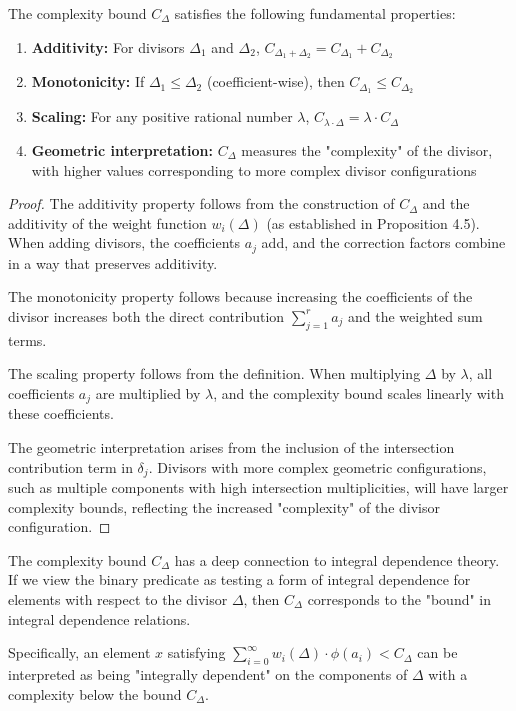 \begin{theorem}\label{thm:complexity-bound-properties}
The complexity bound $C_\Delta$ satisfies the following fundamental properties:
\begin{enumerate}
    \item \textbf{Additivity:} For divisors $\Delta_1$ and $\Delta_2$, $C_{\Delta_1 + \Delta_2} = C_{\Delta_1} + C_{\Delta_2}$
    \item \textbf{Monotonicity:} If $\Delta_1 \leq \Delta_2$ (coefficient-wise), then $C_{\Delta_1} \leq C_{\Delta_2}$
    \item \textbf{Scaling:} For any positive rational number $\lambda$, $C_{\lambda \cdot \Delta} = \lambda \cdot C_{\Delta}$
    \item \textbf{Geometric interpretation:} $C_\Delta$ measures the "complexity" of the divisor, with higher values corresponding to more complex divisor configurations
\end{enumerate}
\end{theorem}

\begin{proof}
The additivity property follows from the construction of $C_\Delta$ and the additivity of the weight function $w_i(\Delta)$ (as established in Proposition 4.5). When adding divisors, the coefficients $a_j$ add, and the correction factors combine in a way that preserves additivity.

The monotonicity property follows because increasing the coefficients of the divisor increases both the direct contribution $\sum_{j=1}^{r} a_j$ and the weighted sum terms.

The scaling property follows from the definition. When multiplying $\Delta$ by $\lambda$, all coefficients $a_j$ are multiplied by $\lambda$, and the complexity bound scales linearly with these coefficients.

The geometric interpretation arises from the inclusion of the intersection contribution term in $\delta_j$. Divisors with more complex geometric configurations, such as multiple components with high intersection multiplicities, will have larger complexity bounds, reflecting the increased "complexity" of the divisor configuration.
\end{proof}

\begin{remark}
The complexity bound $C_\Delta$ has a deep connection to integral dependence theory. If we view the binary predicate as testing a form of integral dependence for elements with respect to the divisor $\Delta$, then $C_\Delta$ corresponds to the "bound" in integral dependence relations.

Specifically, an element $x$ satisfying $\sum_{i=0}^{\infty} w_i(\Delta) \cdot \phi(a_i) < C_\Delta$ can be interpreted as being "integrally dependent" on the components of $\Delta$ with a complexity below the bound $C_\Delta$.
\end{remark}


